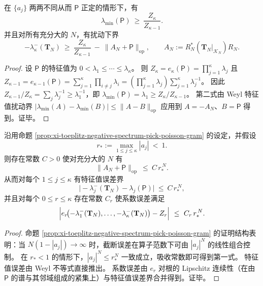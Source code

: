 \begin{corollary}\label{cor:xi-pick-poisson-lambda-min-ratio-bound}
在 \(\{a_j\}\) 两两不同从而 \(\mathsf P\) 正定的情形下，有
\[
\boxed{\;\lambda_{\min}(\mathsf P)\ \ge\ \frac{Z_\kappa}{Z_{\kappa-1}}.\;}
\]
并且对所有充分大的 \(N\)，有扰动下界
\[
-\lambda_\kappa^{-}(\mathbf{T}_N)\ \ge\ \frac{Z_\kappa}{Z_{\kappa-1}}\ -\ \|A_N+\mathsf P\|_{\mathrm{op}},
\qquad
A_N:=R_N^\ast(\mathbf{T}_N|_{\mathcal K_N})R_N.
\]
\end{corollary}
\begin{proof}
设 \(\mathsf P\) 的特征值为 \(0<\lambda_1\le\cdots\le\lambda_\kappa\)。
则
\(
Z_\kappa=e_\kappa(\mathsf P)=\prod_{j=1}^\kappa \lambda_j
\)
且
\(
Z_{\kappa-1}=e_{\kappa-1}(\mathsf P)=\sum_{j=1}^\kappa\prod_{i\ne j}\lambda_i
=(\prod_{j=1}^\kappa\lambda_j)\sum_{j=1}^\kappa\lambda_j^{-1}
\)。
因此
\(
Z_{\kappa-1}/Z_\kappa=\sum_j\lambda_j^{-1}\ge \lambda_1^{-1}
\)，即 \(\lambda_{\min}(\mathsf P)=\lambda_1\ge Z_\kappa/Z_{\kappa-1}\)。
第二式由 Weyl 特征值扰动界 \(|\lambda_{\min}(A)-\lambda_{\min}(B)|\le\|A-B\|_{\mathrm{op}}\) 应用到 \(A=-A_N\)、\(B=\mathsf P\) 得到。证毕。
\end{proof}

\begin{proposition}\label{prop:xi-toeplitz-negative-spectrum-exponential-rate}
沿用命题 \ref{prop:xi-toeplitz-negative-spectrum-pick-poisson-gram} 的设定，并假设
\[
r_\ast:=\max_{1\le j\le\kappa}|a_j|\ <\ 1.
\]
则存在常数 \(C>0\) 使对充分大的 \(N\) 有
\[
\boxed{\;\|A_N+\mathsf P\|_{\mathrm{op}}\ \le\ C\,r_\ast^{\,N}.\;}
\]
从而对每个 \(1\le j\le \kappa\) 有特征值误差界
\[
\bigl|-\lambda_j^-(\mathbf{T}_N)-\lambda_j(\mathsf P)\bigr|\ \le\ C\,r_\ast^{\,N},
\]
并且对每个 \(0\le r\le\kappa\) 存在常数 \(C_r\) 使系数误差满足
\[
\Bigl|e_r\!\bigl(-\lambda_1^-(\mathbf{T}_N),\dots,-\lambda_\kappa^-(\mathbf{T}_N)\bigr)-Z_r\Bigr|
\ \le\ C_r\,r_\ast^{\,N}.
\]
\end{proposition}
\begin{proof}
命题 \ref{prop:xi-toeplitz-negative-spectrum-pick-poisson-gram} 的证明结构表明：当 \(N(1-|a_j|)\to\infty\) 时，截断误差在算子范数下可由 \(|a_j|^N\) 的线性组合控制。
在 \(r_\ast<1\) 的情形下，\(|a_j|^N\le r_\ast^N\) 一致成立，吸收常数即可得到第一式。
特征值误差由 Weyl 不等式直接推出。
系数误差由 \(e_r\) 对根的 Lipschitz 连续性（在由 \(\mathsf P\) 的谱与其邻域组成的紧集上）与特征值误差界合并得到。证毕。
\end{proof}

